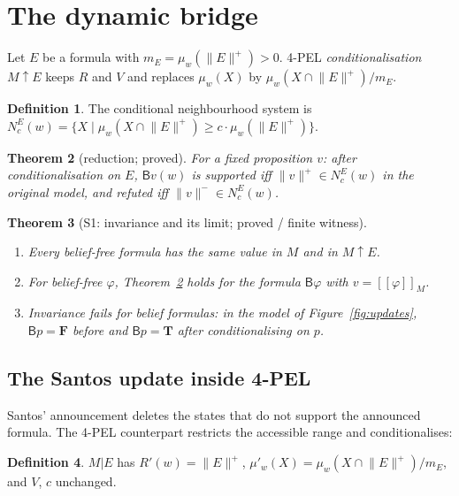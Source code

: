 \documentclass[11pt,a4paper]{article}
\newtheorem{theorem}{Theorem}[section]
\theoremstyle{definition}
\newtheorem{definition}[theorem]{Definition}
\theoremstyle{remark}
\newcommand{\Tv}{\mathbf{T}}\newcommand{\Fv}{\mathbf{F}}
\newcommand{\Bel}{\mathsf{B}}
\newcommand{\pos}[1]{\lVert #1\rVert^{+}}
\newcommand{\negx}[1]{\lVert #1\rVert^{-}}
\begin{document}
\section{The dynamic bridge}\label{sec:dyn}

Let $E$ be a formula with $m_E=\mu_w(\pos{E})>0$. 4-PEL \emph{conditionalisation}
$M\!\uparrow\!E$ keeps $R$ and $V$ and replaces $\mu_w(X)$ by $\mu_w(X\cap\pos{E})/m_E$.

\begin{definition}
The conditional neighbourhood system is
$N^{E}_c(w)=\{X\mid \mu_w(X\cap\pos{E})\ge c\cdot \mu_w(\pos{E})\}$.
\end{definition}

\begin{theorem}[reduction; proved]\label{thm:reduction}
For a fixed proposition $v$: after conditionalisation on $E$, $\Bel v(w)$ is supported iff
$\pos{v}\in N^{E}_c(w)$ in the original model, and refuted iff $\negx{v}\in N^{E}_c(w)$.
\end{theorem}

\begin{theorem}[S1: invariance and its limit; proved / finite witness]\label{thm:s1}
\begin{enumerate}[label=(\alph*),nosep]
\item Every belief-free formula has the same value in $M$ and in $M\!\uparrow\!E$.
\item For belief-free $\varphi$, Theorem~\ref{thm:reduction} holds for the formula
$\Bel\varphi$ with $v=[\![\varphi]\!]_M$.
\item Invariance fails for belief formulas: in the model of Figure~\ref{fig:updates},
$\Bel p=\Fv$ before and $\Bel p=\Tv$ after conditionalising on $p$.
\end{enumerate}
\end{theorem}

\subsection*{The Santos update inside 4-PEL}

Santos' announcement deletes the states that do not support the announced formula. The
4-PEL counterpart restricts the accessible range and conditionalises:

\begin{definition}
$M|E$ has $R'(w)=\pos{E}$, $\mu'_w(X)=\mu_w(X\cap\pos{E})/m_E$, and $V$, $c$ unchanged.
\end{definition}
\end{document}
